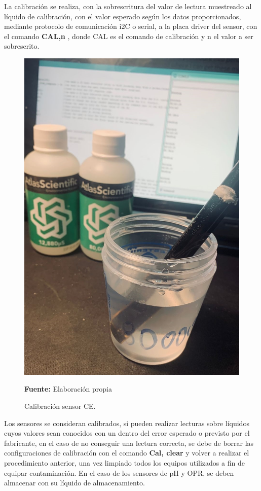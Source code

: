 La calibraci\'on se realiza, con la sobrescritura del valor de lectura muestreado al l\'iquido de calibraci\'on, con el valor esperado seg\'un los datos proporcionados, mediante protocolo de comunicaci\'on i2C o serial, a la placa driver del sensor, con el comando \textbf{CAL,n }, donde CAL es el comando de calibraci\'on y n el valor a ser sobrescrito.
\begin{figure}[H]
        \centering
        \includegraphics[scale=0.5]{Imagenes/cap4/calibracion.jpeg}
        \caption {Calibraci\'on sensor CE. }{\textbf{Fuente:}
        Elaboraci\'on propia}
        \label{fig:kit}
\end{figure}
Los sensores se consideran calibrados, si pueden realizar lecturas sobre l\'iquidos cuyos valores sean conocidos con un dentro del error esperado o previsto por el fabricante, en el caso de no conseguir una lectura correcta, se debe de borrar las configuraciones de calibraci\'on con el comando \textbf{Cal, clear} y volver a realizar el procedimiento anterior, una vez limpiado todos los equipos utilizados a fin de equipar contaminación. 
En el caso de los sensores de pH y OPR, se deben almacenar con su l\'iquido de almacenamiento.
